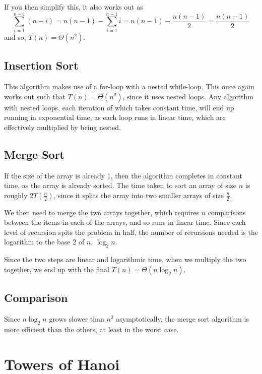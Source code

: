  If you then simplify this, it also works out as
 \begin{equation*}
   \sum_{i=1}^{n-1} (n - i) = n(n-1) - \sum_{i=1}^{n-1} i = n(n - 1) - \frac{n(n-1)}{2} = \frac{n(n-1)}{2}
 \end{equation*}
 and so, $T(n) = \Theta(n^2)$.

\subsection*{Insertion Sort}

This algorithm makes use of a for-loop with a nested while-loop. This once again works out such that
 $T(n) = \Theta(n^2)$, since it uses nested loops. Any algorithm with nested loops, each iteration of which takes
 constant time, will end up running in exponential time, as each loop runs in linear time, which are effectively
 multiplied by being nested.

\subsection*{Merge Sort}

If the size of the array is already 1, then the algorithm completes in constant time, as the array is already sorted.
 The time taken to sort an array of size $n$ is roughly $2T(\frac{n}{2})$, since it splits the array into two smaller
 arrays of size $\frac{n}{2}$.
 
We then need to merge the two arrays together, which requires $n$ comparisons between the items in each of the arrays,
 and so runs in linear time. Since each level of recursion spits the problem in half, the number of recursions needed
 is the logarithm to the base 2 of $n$, $\log_{2}{n}$.

Since the two steps are linear and logarithmic time, when we multiply the two together, we end up with the final
 $T(n) = \Theta(n \log_{2}{n})$.

\subsection*{Comparison}

Since $n \log_{2}{n}$ grows slower than $n^2$ asymptotically, the merge sort algorithm is more efficient than the others, at least in the worst case.

\section*{Towers of Hanoi}

